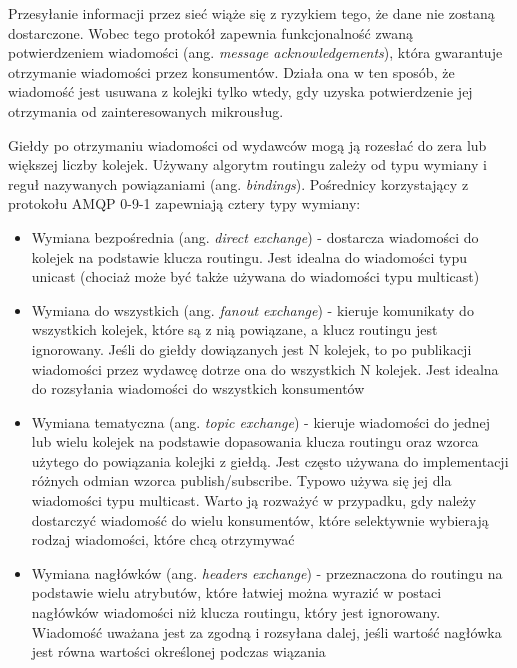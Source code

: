 Przesyłanie informacji przez sieć wiąże się z ryzykiem tego, że dane nie zostaną 
dostarczone. Wobec tego protokół zapewnia funkcjonalność zwaną potwierdzeniem 
wiadomości (ang. \textit{message acknowledgements}), która gwarantuje otrzymanie wiadomości 
przez konsumentów. Działa ona w ten sposób, że wiadomość jest usuwana z kolejki tylko 
wtedy, gdy uzyska potwierdzenie jej otrzymania od zainteresowanych mikrousług.

Giełdy po otrzymaniu wiadomości od wydawców mogą ją rozesłać do zera lub większej 
liczby kolejek. Używany algorytm routingu zależy od typu wymiany i reguł nazywanych 
powiązaniami (ang. \textit{bindings}). Pośrednicy korzystający z protokołu AMQP 0-9-1 zapewniają 
cztery typy wymiany:

\begin{itemize} %
    \item Wymiana bezpośrednia (ang. \textit{direct exchange}) - dostarcza wiadomości do kolejek 
    na podstawie klucza routingu. Jest idealna do wiadomości typu unicast 
    (chociaż może być także używana do wiadomości typu multicast)
    \item Wymiana do wszystkich (ang. \textit{fanout exchange}) - kieruje komunikaty do wszystkich 
    kolejek, które są z nią powiązane, a klucz routingu jest ignorowany. Jeśli do 
    giełdy dowiązanych jest N kolejek, to po publikacji wiadomości przez wydawcę 
    dotrze ona do wszystkich N kolejek. Jest idealna do rozsyłania wiadomości do 
    wszystkich konsumentów
    \item Wymiana tematyczna (ang. \textit{topic exchange}) - kieruje wiadomości do jednej lub 
    wielu kolejek na podstawie dopasowania klucza routingu oraz wzorca użytego do 
    powiązania kolejki z giełdą. Jest często używana do implementacji różnych odmian 
    wzorca publish/subscribe. Typowo używa się jej dla wiadomości typu multicast. 
    Warto ją rozważyć w przypadku, gdy należy dostarczyć wiadomość do wielu 
    konsumentów, które selektywnie wybierają rodzaj wiadomości, które chcą otrzymywać
    \item Wymiana nagłówków (ang. \textit{headers exchange}) - przeznaczona do routingu na 
    podstawie wielu atrybutów, które łatwiej można wyrazić w postaci nagłówków 
    wiadomości niż klucza routingu, który jest ignorowany. Wiadomość uważana jest za 
    zgodną i rozsyłana dalej, jeśli wartość nagłówka jest równa wartości określonej 
    podczas wiązania
\end{itemize}

